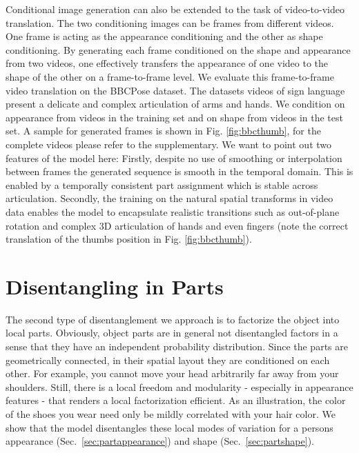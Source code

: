 	Conditional image generation can also be extended to the task of {video-to-video translation}. The two conditioning images can be frames from different videos. One frame is acting as the appearance conditioning and the other as shape conditioning. By generating each frame conditioned on the shape and appearance from two videos, one effectively transfers the appearance of one video to the shape of the other on a frame-to-frame level.
	We evaluate this frame-to-frame video translation on the BBCPose dataset. The datasets videos of sign language present a delicate and complex articulation of arms and hands. We condition on appearance from videos in the training set and on shape from videos in the test set. A sample for generated frames is shown in Fig. \ref{fig:bbcthumb}, for the complete videos please refer to the supplementary.
	We want to point out two features of the model here: Firstly, despite no use of smoothing or interpolation between frames the generated sequence is smooth in the temporal domain. This is enabled by a temporally consistent part assignment which is stable across articulation.
	Secondly, the training on the natural spatial transforms in video data enables the model to encapsulate realistic transitions such as out-of-plane rotation and complex 3D articulation of \eg hands and even fingers (note the correct translation of the thumbs position in Fig. \ref{fig:bbcthumb}). \\

\section{Disentangling in Parts}\label{sec:partwise}
	The second type of disentanglement we approach is to factorize the object into local parts. Obviously, object parts are in general not disentangled factors in a sense that they have an independent probability distribution. Since the parts are geometrically connected, in their spatial layout they are conditioned on each other. For example, you cannot move your head arbitrarily far away from your shoulders. Still, there is a local freedom and modularity - especially in appearance features - that renders a local factorization efficient. As an illustration, the color of the shoes you wear need only be mildly correlated with your hair color.
	We show that the model disentangles these local modes of variation for a persons appearance (Sec.~\ref{sec:partappearance}) and shape (Sec.~\ref{sec:partshape}).

